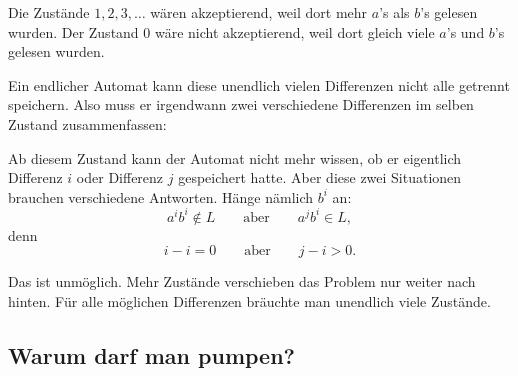 \documentclass[a4paper,12pt]{article}
\begin{document}
Die Zustände $1,2,3,\ldots$ wären akzeptierend, weil dort mehr $a$'s als $b$'s gelesen wurden.
Der Zustand $0$ wäre nicht akzeptierend, weil dort gleich viele $a$'s und $b$'s gelesen wurden.

\medskip
Ein endlicher Automat kann diese unendlich vielen Differenzen nicht alle getrennt speichern.
Also muss er irgendwann zwei verschiedene Differenzen im selben Zustand zusammenfassen:

\begin{center}
\end{center}

Ab diesem Zustand kann der Automat nicht mehr wissen, ob er eigentlich Differenz $i$ oder Differenz $j$ gespeichert hatte.
Aber diese zwei Situationen brauchen verschiedene Antworten.
Hänge nämlich $b^i$ an:
\[
    a^i b^i \notin L
    \qquad\text{aber}\qquad
    a^j b^i \in L,
\]
denn
\[
    i-i=0
    \qquad\text{aber}\qquad
    j-i>0.
\]

\begin{center}
\end{center}

Das ist unmöglich. Mehr Zustände verschieben das Problem nur weiter nach hinten.
Für alle möglichen Differenzen bräuchte man unendlich viele Zustände.

\subsection*{Warum darf man pumpen?}
\end{document}
